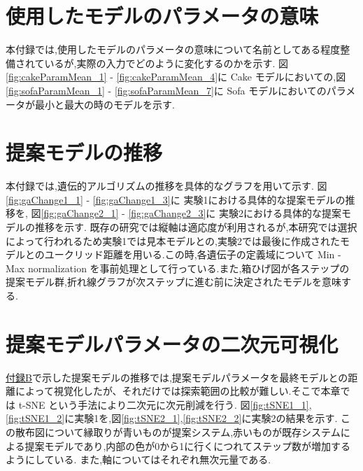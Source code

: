 \clearpage
\appendix

\def\thesection{付録\Alph{section}}
\renewcommand{\thetable}{\Alph{section}.\arabic{table}}
\renewcommand{\thefigure}{\Alph{section}.\arabic{figure}}


\section{使用したモデルのパラメータの意味}\label{paramMean}
本付録では,使用したモデルのパラメータの意味について名前としてある程度整備されているが,実際の入力でどのように変化するのかを示す.
図\ref{fig:cakeParamMean_1} - \ref{fig:cakeParamMean_4}に
Cake モデルにおいての,図\ref{fig:sofaParamMean_1} - \ref{fig:sofaParamMean_7}に Sofa モデルにおいてのパラメータが最小と最大の時のモデルを示す.




\clearpage

\setcounter{table}{0}
\setcounter{figure}{0}

\section{提案モデルの推移}\label{appendix:gaChange}
本付録では,遺伝的アルゴリズムの推移を具体的なグラフを用いて示す.
図\ref{fig:gaChange1_1} - \ref{fig:gaChange1_3}に
実験1における具体的な提案モデルの推移を,
図\ref{fig:gaChange2_1} - \ref{fig:gaChange2_3}に
実験2における具体的な提案モデルの推移を示す.
既存の研究では縦軸は適応度が利用されるが,本研究では選択によって行われるため実験1では見本モデルとの,実験2では最後に作成されたモデルとのユークリッド距離を用いる.この時,各遺伝子の定義域について Min - Max normalization を事前処理として行っている.また,箱ひげ図が各ステップの提案モデル群,折れ線グラフが次ステップに進む前に決定されたモデルを意味する.



\clearpage

\setcounter{table}{0}
\setcounter{figure}{0}

\section{提案モデルパラメータの二次元可視化}\label{appendix:tSNE}
\hyperref[appendix:gaChange]{付録B}で示した提案モデルの推移では,提案モデルパラメータを最終モデルとの距離によって視覚化したが、それだけでは探索範囲の比較が難しい.そこで本章では t-SNE \cite{van2008visualizing} という手法により二次元に次元削減を行う.
図\ref{fig:tSNE1_1},\ref{fig:tSNE1_2}に実験1を,図\ref{fig:tSNE2_1},\ref{fig:tSNE2_2}に実験2の結果を示す.
この散布図について縁取りが青いものが提案システム,赤いものが既存システムによる提案モデルであり,内部の色が0から1に行くにつれてステップ数が増加するようにしている. また,軸についてはそれぞれ無次元量である.

